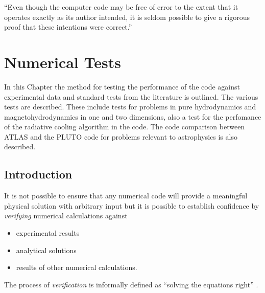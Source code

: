 \begin{savequote}
``Even though the computer code may be free of error to the extent that it operates exactly as its author intended, it is seldom possible to give a rigorous proof that these intentions were correct.''
\end{savequote}



\chapter{Numerical Tests}

In this Chapter the method for testing the performance of the code against
experimental data and standard tests from the literature is outlined. The various
tests are described.
These include tests for problems in pure hydrodynamics and magnetohydrodynamics
in one and two dimensions, also a test for the perfomance of the radiative
cooling algorithm in the code.
The code comparison between ATLAS and the PLUTO code for problems relevant to
astrophysics is also described.

\section{Introduction}
It is not possible to ensure that any numerical code will provide a meaningful physical solution with arbitrary input but it is possible to establish confidence by \emph{verifying} numerical calculations against 
\begin{itemize}
\item experimental results
\item analytical solutions 
\item results of other numerical calculations.
\end{itemize}

The process of \emph{verification} is informally defined as  ``solving the equations right'' \citep{1976cfd..book.....R}.


